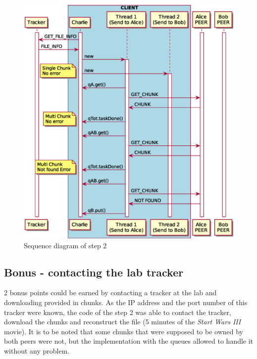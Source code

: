 \begin{figure}
	\centering
	\includegraphics[width=\textwidth]{img/step2.eps}
	\caption{Sequence diagram of step 2}
	\label{fig:step2}
\end{figure}

\subsection{Bonus - contacting the lab tracker}

2 bonus points could be earned by contacting a tracker at the lab and downloading provided in chunks. As the IP address and the port number of this tracker were known, the code of the step 2 was able to contact the tracker, download the chunks and reconstruct the file (5 minutes of the \textit{Start Wars III} movie). It is to be noted that some chunks that were supposed to be owned by both peers were not, but the implementation with the queues allowed to handle it without any problem.


